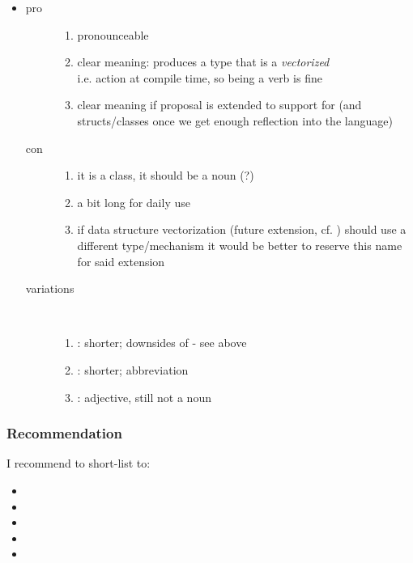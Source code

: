\begin{itemize}
  \item {}
    \begin{description}
      \item[pro]
        \begin{enumerate}
          \item pronounceable
          \item clear meaning: produces a type that is a \emph{vectorized} \\
            i.e. action at compile time, so being a verb is fine
          \item clear meaning if proposal is extended to support  for  (and structs/classes once we get enough reflection into the language)
        \end{enumerate}
      \item[con]
        \begin{enumerate}
          \item it is a class, it should be a noun (?)
          \item a bit long for daily use
          \item if data structure vectorization (future extension, cf. \cite{Kretz2015}) should use a different type/mechanism it would be better to reserve this name for said extension
        \end{enumerate}
      \item[variations]\ 
        \begin{enumerate}
          \item {}: shorter; downsides of  - see above
          \item \code{vectize<T>}: shorter; abbreviation
          \item {}: adjective, still not a noun
        \end{enumerate}
    \end{description}
\end{itemize}

\subsubsection{Recommendation}
I recommend to short-list to:
\begin{itemize}
  \item {}
  \item {}
  \item {}
  \item {}
  \item {}
\end{itemize}

